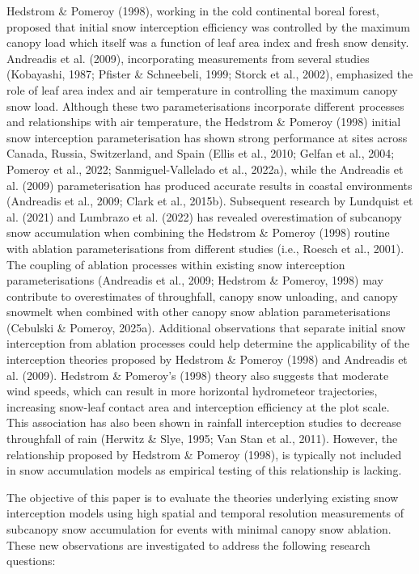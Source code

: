 \documentclass[
  letterpaper,
]{tex/uofsthesis-cs}
\begin{document}
Hedstrom \& Pomeroy (1998), working in the cold continental boreal
forest, proposed that initial snow interception efficiency was
controlled by the maximum canopy load which itself was a function of
leaf area index and fresh snow density. Andreadis et al. (2009),
incorporating measurements from several studies (Kobayashi, 1987;
Pfister \& Schneebeli, 1999; Storck et al., 2002), emphasized the role
of leaf area index and air temperature in controlling the maximum canopy
snow load. Although these two parameterisations incorporate different
processes and relationships with air temperature, the Hedstrom \&
Pomeroy (1998) initial snow interception parameterisation has shown
strong performance at sites across Canada, Russia, Switzerland, and
Spain (Ellis et al., 2010; Gelfan et al., 2004; Pomeroy et al., 2022;
Sanmiguel-Vallelado et al., 2022a), while the Andreadis et al. (2009)
parameterisation has produced accurate results in coastal environments
(Andreadis et al., 2009; Clark et al., 2015b). Subsequent research by
Lundquist et al. (2021) and Lumbrazo et al. (2022) has revealed
overestimation of subcanopy snow accumulation when combining the
Hedstrom \& Pomeroy (1998) routine with ablation parameterisations from
different studies (i.e., Roesch et al., 2001). The coupling of ablation
processes within existing snow interception parameterisations (Andreadis
et al., 2009; Hedstrom \& Pomeroy, 1998) may contribute to overestimates
of throughfall, canopy snow unloading, and canopy snowmelt when combined
with other canopy snow ablation parameterisations (Cebulski \& Pomeroy,
2025a). Additional observations that separate initial snow interception
from ablation processes could help determine the applicability of the
interception theories proposed by Hedstrom \& Pomeroy (1998) and
Andreadis et al. (2009). Hedstrom \& Pomeroy's (1998) theory also
suggests that moderate wind speeds, which can result in more horizontal
hydrometeor trajectories, increasing snow-leaf contact area and
interception efficiency at the plot scale. This association has also
been shown in rainfall interception studies to decrease throughfall of
rain (Herwitz \& Slye, 1995; Van Stan et al., 2011). However, the
relationship proposed by Hedstrom \& Pomeroy (1998), is typically not
included in snow accumulation models as empirical testing of this
relationship is lacking.

The objective of this paper is to evaluate the theories underlying
existing snow interception models using high spatial and temporal
resolution measurements of subcanopy snow accumulation for events with
minimal canopy snow ablation. These new observations are investigated to
address the following research questions:
\end{document}
